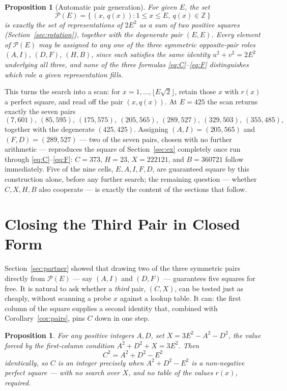 \documentclass[12pt]{article}
\newtheorem{proposition}[theorem]{Proposition}
\theoremstyle{remark}
\begin{document}
\begin{proposition}[Automatic pair generation]\label{prop:autogen}
For given $E$, the set
\[
\mathcal P(E) = \bigl\{\, (x,\,q(x)) : 1 \le x \le E,\ q(x) \in
\mathbb Z \,\bigr\}
\]
is exactly the set of representations of $2E^2$ as a sum of two
positive squares (Section~\ref{sec:rotation}), together with the
degenerate pair $(E,E)$. Every element of $\mathcal P(E)$ may be
assigned to any one of the three symmetric opposite-pair roles $(A,I)$,
$(D,F)$, $(H,B)$, since each satisfies the same identity
$u^2+v^2=2E^2$ underlying all three, and none of the three formulas
\eqref{eq:C}--\eqref{eq:F} distinguishes which role a given
representation fills.
\end{proposition}

This turns the search into a scan: for $x=1,\dots,\lfloor E\sqrt2
\rfloor$, retain those $x$ with $r(x)$ a perfect square, and read off
the pair $(x,q(x))$. At $E=425$ the scan returns exactly the seven
pairs
\[
(7,601),\ (85,595),\ (175,575),\ (205,565),\ (289,527),\
(329,503),\ (355,485),
\]
together with the degenerate $(425,425)$. Assigning
$(A,I)=(205,565)$ and $(F,D)=(289,527)$ --- two of the seven pairs,
chosen with no further arithmetic --- reproduces the square of
Section~\ref{sec:ex} completely once run through
\eqref{eq:C}--\eqref{eq:F}: $C=373$, $H=23$, $X=222121$, and
$B=360721$ follow immediately. Five of the nine cells, $E,A,I,F,D$, are
guaranteed square by this construction alone, before any further
search; the remaining question --- whether $C,X,H,B$ also cooperate ---
is exactly the content of the sections that follow.

\section{Closing the Third Pair in Closed Form}\label{sec:closedform}

Section~\ref{sec:partner} showed that drawing two of the three
symmetric pairs directly from $\mathcal P(E)$ --- say $(A,I)$ and
$(D,F)$ --- guarantees five squares for free. It is natural to ask
whether a \emph{third} pair, $(C,X)$, can be tested just as cheaply,
without scanning a probe $x$ against a lookup table. It can: the first
column of the square supplies a second identity that, combined with
Corollary~\ref{cor:pairs}, pins $C$ down in one step.

\begin{proposition}\label{prop:closedform}
For any positive integers $A,D$, set $X = 3E^2-A^2-D^2$, the value
forced by the first-column condition $A^2+D^2+X=3E^2$. Then
\[
C^2 = A^2+D^2-E^2
\]
identically, so $C$ is an integer precisely when $A^2+D^2-E^2$ is a
non-negative perfect square --- with no search over $X$, and no table
of the values $r(x)$, required.
\end{proposition}
\end{document}
